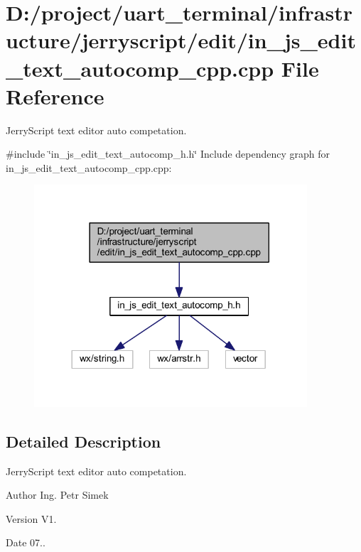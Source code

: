 \section{D\+:/project/uart\+\_\+terminal/infrastructure/jerryscript/edit/in\+\_\+js\+\_\+edit\+\_\+text\+\_\+autocomp\+\_\+cpp.cpp File Reference}
\label{in__js__edit__text__autocomp__cpp_8cpp}


Jerry\+Script text editor auto competation.  


{\ttfamily \#include \char`\"{}in\+\_\+js\+\_\+edit\+\_\+text\+\_\+autocomp\+\_\+h.\+h\char`\"{}}\newline
Include dependency graph for in\+\_\+js\+\_\+edit\+\_\+text\+\_\+autocomp\+\_\+cpp.\+cpp\+:
\nopagebreak
\begin{figure}[H]
\begin{center}
\leavevmode
\includegraphics[width=288pt]{in__js__edit__text__autocomp__cpp_8cpp__incl}
\end{center}
\end{figure}


\subsection{Detailed Description}
Jerry\+Script text editor auto competation. 

\begin{DoxyAuthor}{Author}
Ing. Petr Simek 
\end{DoxyAuthor}
\begin{DoxyVersion}{Version}
V1. 
\end{DoxyVersion}
\begin{DoxyDate}{Date}
07.. 
\end{DoxyDate}
